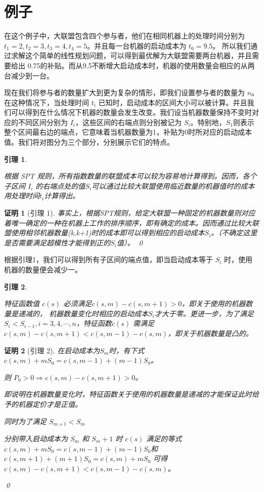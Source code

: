 \documentclass[UTF8]{article}
\newtheorem{lem}{\hspace{2em}引理}
\newtheorem{pf}{\hspace{2em}证明}
\begin{document}
\section{例子}
在这个例子中，大联盟包含四个参与者，他们在相同机器上的处理时间分别为 $t_1=2,t_2=3,t_3=4,t_4=5$。并且每一台机器的启动成本为 $t_0=9.5$。
所以我们通过求解这个简单的线性规划问题，可以得到最优解为大联盟需要两台机器，并且需要给出 0.75的补贴。而从9.5不断增大启动成本时，机器的使用数量会相应的从两台减少到一台。

现在我们将参与者的数量扩大到更为复杂的情形，即我们设置参与者的数量为 $n$。在这种情况下，当处理时间 $t_i$ 已知时，启动成本的区间大小可以被计算。并且我们可以得到在什么情况下机器的数量会发生改变。我们设当机器数量保持不变时对应的不同区间分别为 $I_i$，这些区间的右端点则分别被记为 $S_i$。特别地，$S_1$则表示整个区间最右边的端点，它意味着当机器数量为1，补贴为0时所对应的启动成本值。我们将对图分为三个部分，分别展示它们的特点。


\begin{lem}\label{lem1}

根据 SPT 规则，所有指数数量的联盟成本可以较为容易地计算得到。因而，各个子区间 $I_i$ 的右端点处的值$S_i$可以通过比较大联盟使用临近数量的机器值时的成本用处理时间$t_i$计算得出。

\end{lem}

\begin{pf}[引理 1]

事实上，根据SPT规则，给定大联盟一种固定的机器数量则对应着唯一确定的一种在机器上工作的排序顺序，即有确定的成本。因而通过比较大联盟使用相邻机器数量(k,k+1)时的成本即可以得到相应的启动成本$S_i$。（不确定这里是否需要满足超模性才能得到正的$S_i$值）。
\qed
\end{pf}

根据引理1，我们可以得到所有子区间的端点值，即当启动成本等于 $S_i$ 时，使用机器的数量便会减少一。

\begin{lem}\label{lem2}

特征函数值 $c(s)$ 必须满足$c(s,m) - c(s,m+1) > 0$，即关于使用的机器数量是递减的，
机器数量变化时相应的启动成本$S_i$才大于零。更进一步，为了满足$S_i < S_{i-1} , i=3,4,\cdots,n$，特征函数$c(s)$
需满足$c(s,m) - c(s,m+1) < c(s,m-1) - c(s,m)$，即关于机器数量是凸的。

\end{lem}

\begin{pf}[引理 2]

在启动成本为$S_m$时，有下式 $c(s,m)+mS_0 = c(s,m-1)+(m-1)S_0$。

则 $P_0 >0 \Rightarrow c(s,m) - c(s,m+1) > 0$。

即说明在机器数量变化时，特征函数关于使用的机器数量是递减的才能保证此时给予的机器定价才是正值。

同时为了满足 $S_{m+1} < S_m$

分别带入启动成本为 $S_m$ 和 $S_m+1$ 时 $c(s)$ 满足的等式
$c(s,m)+mS_0 = c(s,m-1)+(m-1)S_0$和$c(s,m+1)+(m+1)S_0 = c(s,m)+mS_0$
可得
$c(s,m)- c(s,m+1) < c(s,m-1)- c(s,m)$。

\qed
\end{pf}
\end{document}
